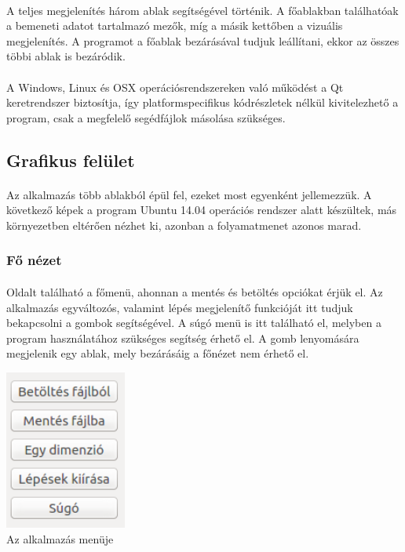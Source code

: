 \documentclass[12pt]{report}
\begin{document}
\paragraph{}
A teljes megjelenítés három ablak segítségével történik. A főablakban találhatóak a bemeneti adatot tartalmazó mezők, míg a másik kettőben a vizuális megjelenítés. A programot a főablak bezárásával tudjuk leállítani, ekkor az összes többi ablak is bezáródik.
\paragraph{}
A Windows, Linux és OSX operációsrendszereken való működést a Qt keretrendszer biztosítja, így platformspecifikus kódrészletek nélkül kivitelezhető a program, csak a megfelelő segédfájlok másolása szükséges.
\subsection{Grafikus felület}
\paragraph{}
Az alkalmazás több ablakból épül fel, ezeket most egyenként jellemezzük. A következő képek a program Ubuntu 14.04 operációs rendszer alatt készültek, más környezetben eltérően nézhet ki, azonban a folyamatmenet azonos marad.
\subsubsection{Fő nézet}
\paragraph{}
Oldalt található a főmenü, ahonnan a mentés és betöltés opciókat érjük el. Az alkalmazás egyváltozós, valamint lépés megjelenítő funkcióját itt tudjuk bekapcsolni a gombok segítségével. A súgó menü is itt található el, melyben a program használatához szükséges segítség érhető el. A gomb lenyomására megjelenik egy ablak, mely bezárásáig a főnézet nem érhető el.
\begin{center}
\includegraphics[width=4cm]{pics/gui/menu} \\
{\footnotesize Az alkalmazás menüje}
\end{center}
\end{document}
